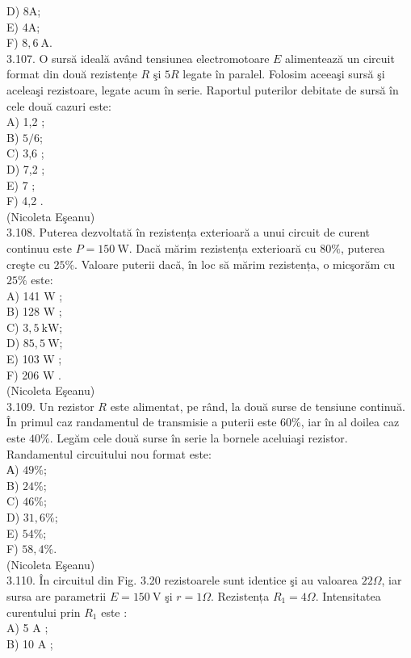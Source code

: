 \documentclass[10pt]{article}
\begin{document}
D) 8A;\\
E) 4A;\\
F) $8,6 \mathrm{~A}$.\\
3.107. O sursă ideală având tensiunea electromotoare $E$ alimentează un circuit format din două rezistențe $R$ şi $5 R$ legate în paralel. Folosim aceeaşi sursă şi aceleaşi rezistoare, legate acum în serie. Raportul puterilor debitate de sursă în cele două cazuri este:\\
A) 1,2 ;\\
B) $5 / 6$;\\
C) 3,6 ;\\
D) 7,2 ;\\
E) 7 ;\\
F) 4,2 .\\
(Nicoleta Eşeanu)\\
3.108. Puterea dezvoltată în rezistența exterioară a unui circuit de curent continuu este $P=150 \mathrm{~W}$. Dacă mărim rezistența exterioară cu $80 \%$, puterea creşte cu $25 \%$. Valoare puterii dacă, în loc să mărim rezistența, o micşorăm cu $25 \%$ este:\\
A) 141 W ;\\
B) 128 W ;\\
C) $3,5 \mathrm{~kW}$;\\
D) $85,5 \mathrm{~W}$;\\
E) 103 W ;\\
F) 206 W .\\
(Nicoleta Eşeanu)\\
3.109. Un rezistor $R$ este alimentat, pe rând, la două surse de tensiune continuă. În primul caz randamentul de transmisie a puterii este $60 \%$, iar în al doilea caz este $40 \%$. Legăm cele două surse în serie la bornele aceluiaşi rezistor. Randamentul circuitului nou format este:\\
А) $49 \%$;\\
B) $24 \%$;\\
C) $46 \%$;\\
D) $31,6 \%$;\\
E) $54 \%$;\\
F) $58,4 \%$.\\
(Nicoleta Eşeanu)\\
3.110. În circuitul din Fig. 3.20 rezistoarele sunt identice şi au valoarea $22 \Omega$, iar sursa are parametrii $E=150 \mathrm{~V}$ şi $r=1 \Omega$. Rezistența $R_{1}=4 \Omega$. Intensitatea curentului prin $R_{1}$ este :\\
A) 5 A ;\\
B) 10 A ;\\
\end{document}
